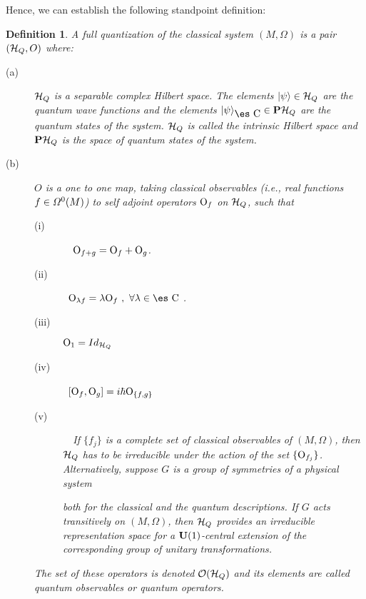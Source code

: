 \documentclass[12pt]{article}
\newtheorem{definition}{Definition}
\def\H{{\cal H}}
\def\sta{|\psi \rangle }
\def\Op{{\rm O}}
\def\Complex{\mbox{\es C}}
\begin{document}
Hence, we can establish the following standpoint definition:

\begin{definition}
A {\rm full quantization} of the classical system $(M,\Omega )$
is a pair $(\H_Q,O)$ where:
\begin{description}
\item[{\rm (a)}]
$\H_Q$ is a separable complex Hilbert space.
The elements $\sta \in \H_Q$ are the {\rm quantum wave functions}
and the elements $\sta_{\Complex} \in {\bf P}\H_Q$
are the {\rm quantum states} of the system. $\H_Q$ is called the
{\rm intrinsic Hilbert space} and ${\bf P}\H_Q$ is the
{\rm space of quantum states} of the system.
\item[{\rm (b)}]
$O$ is a one to one map, taking classical observables
(i.e., real functions $f \in {\mit\Omega}^0(M)$) to self adjoint
operators
$\Op_f$ on $\H_Q$, such that
\begin{description}
\item[{\rm (i)}] \ \
$\Op_{f+g} =\Op_f+\Op_g$.
\item[{\rm (ii)}] \
$\Op_{\lambda f} = \lambda \Op_f \ , \
\forall \lambda \in \Complex$ .
\item[{\rm (iii)}]
$\Op_1 = Id_{\H_Q}$
\item[{\rm (iv)}] \
$[\Op_f,\Op_g] = i \hbar \Op_{\{ f,g \}}$
\item[{\rm (v)}] \ \
If $\{ f_j \}$ is a complete set of classical observables
of $(M,\Omega )$, then $\H_Q$ has to be irreducible
under the action of the set $\{ \Op_{f_j} \}$.
Alternatively, suppose $G$ is a group of symmetries of a physical system

both for the classical and the quantum descriptions.
If $G$ acts transitively on $(M, \Omega )$,
then $\H_Q$ provides an irreducible representation space
for a ${\bf U}(1)$-central extension of the corresponding
group of unitary transformations.
\end{description}
The set of these operators is denoted ${\cal O}(\H_Q)$
and its elements are called {\rm quantum observables} or {\rm quantum
operators}.
\end{description}
\label{fquan}
\end{definition}
\end{document}
